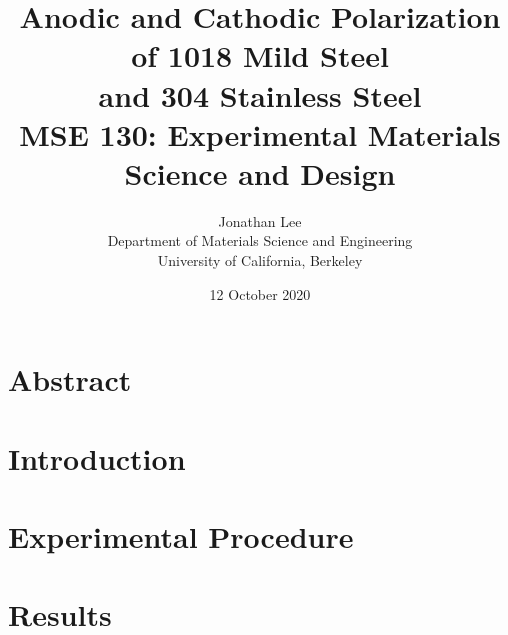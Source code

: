 \documentclass[12pt, titlepage]{article}
\title{\Large Anodic and Cathodic Polarization of 1018 Mild Steel \\
		and 304 Stainless Steel \\
		\bigskip
	\normalsize MSE 130: Experimental Materials Science and Design}
\author{\normalsize Jonathan Lee \\
	\normalsize Department of Materials Science and Engineering \\
	\normalsize University of California, Berkeley}
\date{\normalsize 12 October 2020}
\begin{document}
\maketitle

\doublespacing

\setcounter{page}{2}

\tableofcontents

\newpage

\section{Abstract}

\section{Introduction}

% 

\section{Experimental Procedure}

% 

\begin{table}[h!]
	\centering
	
\end{table}

\begin{table}[h!]
	\centering
	
\end{table}

\begin{table}[h!]
	\centering
	
\end{table}

\begin{table}[h!]
	\centering
	
\end{table}

\begin{table}[h!]
	\centering
	
\end{table}

\begin{table}[h!]
	\centering
	
\end{table}

\section{Results}
\end{document}
